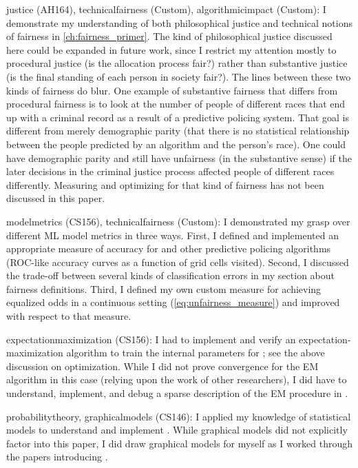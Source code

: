 \begin{itemize}
\hashtag justice (AH164), technicalfairness (Custom), algorithmicimpact (Custom): I demonstrate my understanding of both philosophical justice and technical notions of fairness in \autoref{ch:fairness_primer}. The kind of philosophical justice discussed here could be expanded in future work, since I restrict my attention mostly to procedural justice (is the allocation process fair?) rather than substantive justice (is the final standing of each person in society fair?). The lines between these two kinds of fairness do blur. One example of substantive fairness that differs from procedural fairness is to look at the number of people of different races that end up with a criminal record as a result of a predictive policing system. That goal is different from merely demographic parity (that there is no statistical relationship between the people predicted by an algorithm and the person's race). One could have demographic parity and still have unfairness (in the substantive sense) if the later decisions in the criminal justice process affected people of different races differently. Measuring and optimizing for that kind of fairness has not been discussed in this paper.

\hashtag modelmetrics (CS156), technicalfairness (Custom): I demonstrated my grasp over different ML model metrics in three ways. First, I defined and implemented an appropriate measure of accuracy for \pp and other predictive policing algorithms (ROC-like accuracy curves as a function of grid cells visited). Second, I discussed the trade-off between several kinds of classification errors in my section about fairness definitions. Third, I defined my own custom measure for achieving equalized odds in a continuous setting (\autoref{eq:unfairness_measure}) and improved \pp with respect to that measure.

\hashtag expectationmaximization (CS156): I had to implement and verify an expectation-maximization algorithm to train the internal parameters for \pp; see the above discussion on optimization. While I did not prove convergence for the EM algorithm in this case (relying upon the work of other researchers), I did have to understand, implement, and debug a sparse description of the EM procedure in \citet{mohler_marked_2014}.

\hashtag probabilitytheory, graphicalmodels (CS146): I applied my knowledge of statistical models to understand and implement \pp. While graphical models did not explicitly factor into this paper, I did draw graphical models for myself as I worked through the papers introducing \pp.


\end{itemize}
